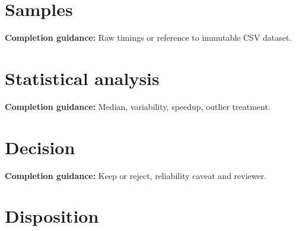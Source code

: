 \documentclass[10pt,letterpaper]{article}
\begin{document}
\section{Samples}
\textbf{Completion guidance:} Raw timings or reference to immutable CSV dataset.\par\medskip{}
\section{Statistical analysis}
\textbf{Completion guidance:} Median, variability, speedup, outlier treatment.\par\medskip{}
\section{Decision}
\textbf{Completion guidance:} Keep or reject, reliability caveat and reviewer.\par\medskip{}
\section{Disposition}
\end{document}
